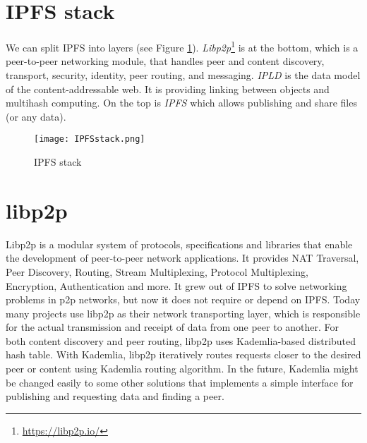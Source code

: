 \section{IPFS stack}
We can split IPFS into layers (see Figure \ref{IPFSstack}). \textit{Libp2p}\footnote{\url{https://libp2p.io/}} is at the bottom, which is a peer-to-peer networking module, that handles peer and content discovery, transport, security, identity, peer routing, and messaging. \textit{IPLD} is the data model of the content-addressable web. It is providing linking between objects and multihash computing. On the top is \textit{IPFS} which allows publishing and share files (or any data).\cite{IPFSwhitepaper}


\begin{figure}[h]
    \centering
    \texttt{[image: IPFSstack.png]}
    \caption{IPFS stack}
    \label{IPFSstack}
\end{figure}


\section{libp2p}
Libp2p is a modular system of protocols, specifications and libraries that enable the development of peer-to-peer network applications. It provides NAT Traversal, Peer Discovery, Routing, Stream Multiplexing, Protocol Multiplexing, Encryption, Authentication and more. It grew out of IPFS to solve networking problems in p2p networks, but now it does not require or depend on IPFS. Today many projects use libp2p as their network transporting layer, which is responsible for the actual transmission and receipt of data from one peer to another. For both content discovery and peer routing, libp2p uses Kademlia-based distributed hash table. With Kademlia, libp2p iteratively routes requests closer to the desired peer or content using Kademlia routing algorithm\cite{kademlia}. In the future, Kademlia might be changed easily to some other solutions that implements a simple interface for publishing and requesting data and finding a peer.\cite{WebEngineering}





